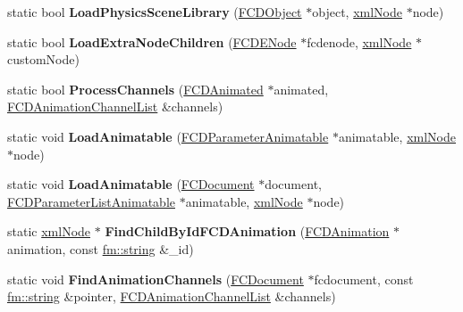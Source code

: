 \begin{DoxyCompactItemize}
\item 
\hypertarget{classFArchiveXML_a8cf7879dc4f84137474fcb012374c22d}{
static bool {\bfseries LoadPhysicsSceneLibrary} (\hyperlink{classFCDObject}{FCDObject} $\ast$object, \hyperlink{struct__xmlNode}{xmlNode} $\ast$node)}
\label{classFArchiveXML_a8cf7879dc4f84137474fcb012374c22d}

\item 
\hypertarget{classFArchiveXML_ad03e1e9e001d625c8438aa3a71d4d6d5}{
static bool {\bfseries LoadExtraNodeChildren} (\hyperlink{classFCDENode}{FCDENode} $\ast$fcdenode, \hyperlink{struct__xmlNode}{xmlNode} $\ast$customNode)}
\label{classFArchiveXML_ad03e1e9e001d625c8438aa3a71d4d6d5}

\item 
\hypertarget{classFArchiveXML_a8cec0caf19b3157792f9f1f5473110f2}{
static bool {\bfseries ProcessChannels} (\hyperlink{classFCDAnimated}{FCDAnimated} $\ast$animated, \hyperlink{classfm_1_1pvector}{FCDAnimationChannelList} \&channels)}
\label{classFArchiveXML_a8cec0caf19b3157792f9f1f5473110f2}

\item 
\hypertarget{classFArchiveXML_aeffdfc74a3cb92835bdbbc2c96f1baf4}{
static void {\bfseries LoadAnimatable} (\hyperlink{classFCDParameterAnimatable}{FCDParameterAnimatable} $\ast$animatable, \hyperlink{struct__xmlNode}{xmlNode} $\ast$node)}
\label{classFArchiveXML_aeffdfc74a3cb92835bdbbc2c96f1baf4}

\item 
\hypertarget{classFArchiveXML_ab26f7d5436249b4fdaa0aa156cc99d7c}{
static void {\bfseries LoadAnimatable} (\hyperlink{classFCDocument}{FCDocument} $\ast$document, \hyperlink{classFCDParameterListAnimatable}{FCDParameterListAnimatable} $\ast$animatable, \hyperlink{struct__xmlNode}{xmlNode} $\ast$node)}
\label{classFArchiveXML_ab26f7d5436249b4fdaa0aa156cc99d7c}

\item 
\hypertarget{classFArchiveXML_aa2c06cf876f47a3b7f95021ee117ba66}{
static \hyperlink{struct__xmlNode}{xmlNode} $\ast$ {\bfseries FindChildByIdFCDAnimation} (\hyperlink{classFCDAnimation}{FCDAnimation} $\ast$animation, const \hyperlink{classfm_1_1stringT}{fm::string} \&\_\-id)}
\label{classFArchiveXML_aa2c06cf876f47a3b7f95021ee117ba66}

\item 
\hypertarget{classFArchiveXML_a646a4f6aee23ef1cf9e1d6429f4dd4d8}{
static void {\bfseries FindAnimationChannels} (\hyperlink{classFCDocument}{FCDocument} $\ast$fcdocument, const \hyperlink{classfm_1_1stringT}{fm::string} \&pointer, \hyperlink{classfm_1_1pvector}{FCDAnimationChannelList} \&channels)}
\label{classFArchiveXML_a646a4f6aee23ef1cf9e1d6429f4dd4d8}


\end{DoxyCompactItemize}
